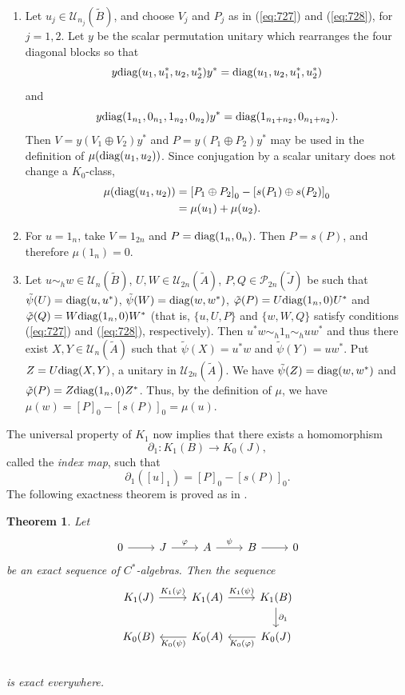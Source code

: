 \documentclass{book}
\newtheorem{theorem}[definition]{Theorem}
\def\cstars{\(C^*\)-algebras}
\def\diag{\textnormal{diag}}
\begin{document}
\begin{enumerate}
  \item Let \(u_j\in\mathcal{U}_{n_j}(\tilde{B})\), and choose \(V_j\) and \(P_j\) as in
  (\ref{eq:727}) and (\ref{eq:728}), for \(j=1,2\). Let \(y\) be the scalar permutation
  unitary which rearranges the four diagonal blocks so that
  \[
    y\diag(u_1,u_1^*,u_2,u_2^*)y^*
      =\diag(u_1,u_2,u_1^*,u_2^*)
  \]
  and
  \[
    y\diag(1_{n_1},0_{n_1},1_{n_2},0_{n_2})y^*
      =\diag(1_{n_1+n_2},0_{n_1+n_2}).
  \]
  Then \(V=y(V_1\oplus V_2)y^*\) and \(P=y(P_1\oplus P_2)y^*\) may be used in
  the definition of \(\mu(\diag(u_1,u_2))\). Since conjugation by a scalar unitary does
  not change a \(K_0\)-class,
  \begin{align*}
    \mu(\diag(u_1,u_2))
      &={[P_1\oplus P_2]}_0-{[s(P_1)\oplus s(P_2)]}_0\\
      &=\mu(u_1)+\mu(u_2).
  \end{align*}
  \item For \(u=1_n\), take \(V=1_{2n}\) and \(P=\diag(1_n,0_n)\). Then
  \(P=s(P)\), and therefore \(\mu(1_n)=0\).
  \item Let \(u\sim_h w\in\mathcal{U}_n(\tilde{B})\), \(U,W\in\mathcal{U}_{2n}(\tilde{A})\), \(P,Q\in\mathcal{P}_{2n}(\tilde{J})\)
    be such that \(\tilde{\psi}(U)=\diag(u,u^*)\), \(\tilde{\psi}(W)=\diag(w,w^*)\), \(\tilde{\varphi}(P)=U\diag(1_n,0)U^*\)
    and \(\tilde{\varphi}(Q)=W\diag(1_n,0)W^*\) (that is, \(\{u,U,P\}\) and \(\{w,W,Q\}\) satisfy conditions (\ref{eq:727}) and (\ref{eq:728}), respectively).
    Then \(u^*w\sim_h 1_n\sim_h uw^*\) and thus there exist \(X,Y\in\mathcal{U}_n(\tilde{A})\) such that
    \(\tilde{\psi}(X)=u^*w\) and \(\tilde{\psi}(Y)=uw^*\). Put \(Z=U\diag(X,Y)\), a unitary in \(\mathcal{U}_{2n}(\tilde{A})\).
    We have \(\tilde{\psi}(Z)=\diag(w,w^*)\) and \(\tilde{\varphi}(P)=Z\diag(1_n,0)Z^*\).
    Thus, by the definition of \(\mu\), we have \(\mu(w)={[P]}_0-{[s(P)]}_0=\mu(u)\). 
\end{enumerate}
The universal property of \(K_1\) now implies that there exists
a homomorphism 
\[
  \partial_1:K_1(B)\rightarrow K_0(J),
\]
called the \textit{index map}, such that
\[
  \partial_1({[u]}_1)={[P]}_0-{[s(P)]}_0.
\]
The following exactness theorem is proved as in
\cite[Proposition~9.3.3]{RordamLarsenLaustsen2000}.
\begin{theorem}\label{theorem:727}
  Let
  \[
    \begin{tikzcd}
    0\arrow[r] &J \arrow[r, "\varphi"]& A \arrow[r, "\psi"]&B\arrow[r]& 0
    \end{tikzcd} 
  \]
  be an exact sequence of \cstars. Then the sequence
  \begin{equation}
    \begin{tikzcd}
    K_1(J) \arrow[r, "K_1(\varphi)"] & K_1(A) \arrow[r, "K_1(\psi)"]&K_1(B)\arrow[d,"\partial_1"]\\
    K_0(B) & K_0(A)\arrow[l, "K_0(\psi)"] &K_0(J)\arrow[l, "K_0(\varphi)"]\\
    \end{tikzcd} 
  \end{equation}
  is exact everywhere.
\end{theorem}
\end{document}
